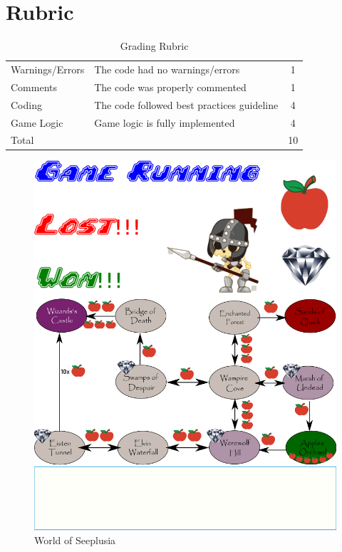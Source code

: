 \documentclass[a4paper,12pt]{article}
\begin{document}
	\section{Rubric}
	\begin{table}[h]
	    \centering
	    \begin{tabular}{llc}
	    \toprule
            Warnings/Errors	& The code had no warnings/errors	& 1 \\
            Comments &	The code was properly commented	& 1 \\
            Coding	& The code followed best practices guideline &	4 \\
            Game Logic	& Game logic is fully implemented	& 4 \\
            \midrule
            Total & & 10\\
            \bottomrule
	    \end{tabular}
	    \caption{Grading Rubric}
	    \label{Grading}
	\end{table}

		
\begin{figure}
	\centering
	\includegraphics[trim={0 0 0 9cm},clip, width=1\linewidth]{Seeplusia/assests}
	\caption{World of Seeplusia}
	\label{fig:assests}
\end{figure}
\end{document}
